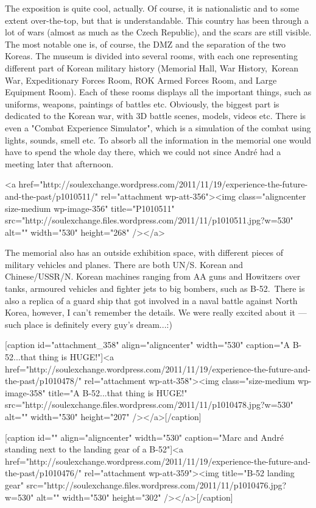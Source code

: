 \begin{post}
\begin{content}
The exposition is quite cool, actually. Of course, it is nationalistic and to some extent over-the-top, but that is understandable. This country has been through a lot of wars (almost as much as the Czech Republic), and the scars are still visible. The most notable one is, of course, the DMZ and the separation of the two Koreas. The museum is divided into several rooms, with each one representing different part of Korean military history (Memorial Hall, War History, Korean War, Expeditionary Forces Room, ROK Armed Forces Room, and Large Equipment Room). Each of these rooms displays all the important things, such as uniforms, weapons, paintings of battles etc. Obviously, the biggest part is dedicated to the Korean war, with 3D battle scenes, models, videos etc. There is even a "Combat Experience Simulator", which is a simulation of the combat using lights, sounds, smell etc. To absorb all the information in the memorial one would have to spend the whole day there, which we could not since André had a meeting later that afternoon.

<a href="http://soulexchange.wordpress.com/2011/11/19/experience-the-future-and-the-past/p1010511/" rel="attachment wp-att-356"><img class="aligncenter size-medium wp-image-356" title="P1010511" src="http://soulexchange.files.wordpress.com/2011/11/p1010511.jpg?w=530" alt="" width="530" height="268" /></a>

The memorial also has an outside exhibition space, with different pieces of military vehicles and planes. There are both UN/S. Korean and Chinese/USSR/N. Korean machines ranging from AA guns and Howitzers over tanks, armoured vehicles and fighter jets to big bombers, such as B-52. There is also a replica of a guard ship that got involved in a naval battle against North Korea, however, I can't remember the details. We were really excited about it — such place is definitely every guy's dream...:)

[caption id="attachment_358" align="aligncenter" width="530" caption="A B-52...that thing is HUGE!"]<a href="http://soulexchange.wordpress.com/2011/11/19/experience-the-future-and-the-past/p1010478/" rel="attachment wp-att-358"><img class="size-medium wp-image-358" title="A B-52...that thing is HUGE!" src="http://soulexchange.files.wordpress.com/2011/11/p1010478.jpg?w=530" alt="" width="530" height="207" /></a>[/caption]

[caption id="" align="aligncenter" width="530" caption="Marc and André standing next to the landing gear of a B-52"]<a href="http://soulexchange.wordpress.com/2011/11/19/experience-the-future-and-the-past/p1010476/" rel="attachment wp-att-359"><img title="B-52 landing gear" src="http://soulexchange.files.wordpress.com/2011/11/p1010476.jpg?w=530" alt="" width="530" height="302" /></a>[/caption]


\end{content}
\end{post}
